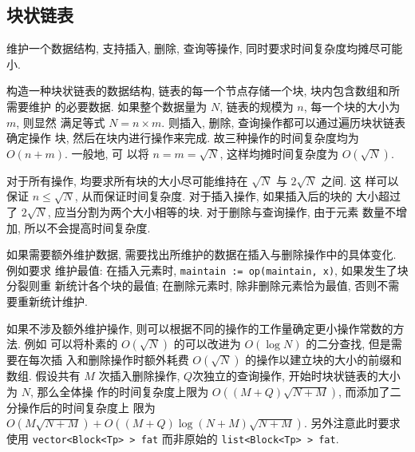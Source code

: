 	\subsection{块状链表}\small
维护一个数据结构, 支持插入, 删除, 查询等操作, 同时要求时间复杂度均摊尽可能小.

构造一种块状链表的数据结构, 链表的每一个节点存储一个块, 块内包含数组和所需要维护
的必要数据. 如果整个数据量为 $N$, 链表的规模为 $n$, 每一个块的大小为 $m$, 则显然
满足等式 $N = n \times m$. 则插入, 删除, 查询操作都可以通过遍历块状链表确定操作
块, 然后在块内进行操作来完成. 故三种操作的时间复杂度均为 $O(n + m)$. 一般地, 可
以将 $n = m = \sqrt{N}$, 这样均摊时间复杂度为 $O(\sqrt{N})$.

对于所有操作, 均要求所有块的大小尽可能维持在 $\sqrt{N}$ 与 $2\sqrt{N}$ 之间. 这
样可以保证 $n \leq \sqrt{N}$, 从而保证时间复杂度. 对于插入操作, 如果插入后的块的
大小超过了 $2\sqrt{N}$, 应当分割为两个大小相等的块. 对于删除与查询操作, 由于元素
数量不增加, 所以不会提高时间复杂度.

如果需要额外维护数据, 需要找出所维护的数据在插入与删除操作中的具体变化. 例如要求
维护最值: 在插入元素时, \verb`maintain := op(maintain, x)`, 如果发生了块分裂则重
新统计各个块的最值; 在删除元素时, 除非删除元素恰为最值, 否则不需要重新统计维护.

如果不涉及额外维护操作, 则可以根据不同的操作的工作量确定更小操作常数的方法. 例如
可以将朴素的 $O(\sqrt{N})$ 的可以改进为 $O(\log N)$ 的二分查找, 但是需要在每次插
入和删除操作时额外耗费 $O(\sqrt{N})$ 的操作以建立块的大小的前缀和数组. 假设共有
$M$ 次插入删除操作, $Q$次独立的查询操作, 开始时块状链表的大小为 $N$, 那么全体操
作的时间复杂度上限为 $O((M + Q)\sqrt{N + M})$, 而添加了二分操作后的时间复杂度上
限为 $O(M\sqrt{N + M}) + O((M + Q)\log (N + M) \sqrt{N + M})$. 另外注意此时要求
使用 \verb`vector<Block<Tp> > fat` 而非原始的 \verb`list<Block<Tp> > fat`.

